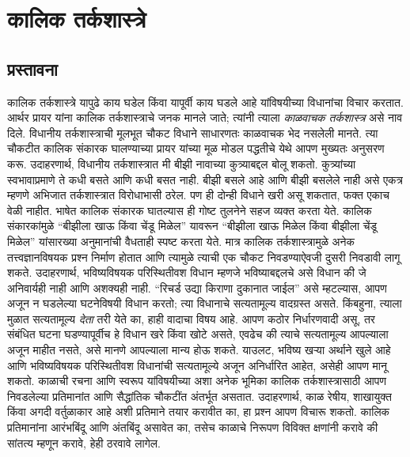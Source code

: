 \chapter{कालिक तर्कशास्त्रे}\label{aml:tl:chap}
\section{प्रस्तावना}\label{aml:tl:int:sec}
कालिक तर्कशास्त्रे यापुढे काय घडेल किंवा यापूर्वी
काय घडले आहे यांविषयीच्या विधानांचा विचार करतात.
आर्थर प्रायर यांना कालिक तर्कशास्त्राचे जनक मानले
जाते; त्यांनी त्याला \emph{काळवाचक तर्कशास्त्र}
असे नाव दिले. विधानीय तर्कशास्त्राची मूलभूत चौकट
विधाने साधारणतः काळवाचक भेद नसलेली मानते. त्या
चौकटीत कालिक संकारक घालण्याच्या प्रायर यांच्या
मूळ मोडल पद्धतीचे येथे आपण मुख्यतः अनुसरण करू.
उदाहरणार्थ, विधानीय तर्कशास्त्रात मी बीझी नावाच्या
कुत्र्याबद्दल बोलू शकतो. कुत्र्यांच्या स्वभावाप्रमाणे
ते कधी बसते आणि कधी बसत नाही. बीझी बसले आहे
आणि बीझी बसलेले नाही असे एकत्र म्हणणे अभिजात
तर्कशास्त्रात विरोधाभासी ठरेल. पण ही दोन्ही विधाने
खरी असू शकतात, फक्त एकाच वेळी नाहीत. भाषेत
कालिक संकारक घातल्यास ही गोष्ट तुलनेने सहज
व्यक्त करता येते. कालिक संकारकांमुळे ``बीझीला
खाऊ किंवा चेंडू मिळेल'' यावरून ``बीझीला खाऊ
मिळेल किंवा बीझीला चेंडू मिळेल'' यांसारख्या
अनुमानांची वैधताही स्पष्ट करता येते.
मात्र कालिक तर्कशास्त्रामुळे अनेक तत्त्वज्ञानविषयक
प्रश्न निर्माण होतात आणि त्यामुळे त्याची एक चौकट
निवडण्याऐवजी दुसरी निवडावी लागू शकते. उदाहरणार्थ,
भविष्यविषयक परिस्थितीवश विधान म्हणजे भविष्याबद्दलचे
असे विधान की जे अनिवार्यही नाही आणि अशक्यही नाही.
``रिचर्ड उद्या किराणा दुकानात जाईल'' असे म्हटल्यास,
आपण अजून न घडलेल्या घटनेविषयी विधान करतो; त्या
विधानाचे सत्यतामूल्य वादग्रस्त असते. किंबहुना,
त्याला मुळात सत्यतामूल्य \emph{देता} तरी येते का,
हाही वादाचा विषय आहे. आपण कठोर निर्धारणवादी
असू, तर संबंधित घटना घडण्यापूर्वीच हे विधान
खरे किंवा खोटे असते, एवढेच की त्याचे सत्यतामूल्य
आपल्याला अजून माहीत नसते, असे मानणे आपल्याला
मान्य होऊ शकते. याउलट, भविष्य खऱ्या अर्थाने
खुले आहे आणि भविष्यविषयक परिस्थितीवश विधानांची
सत्यतामूल्ये अजून अनिर्धारित आहेत, असेही आपण
मानू शकतो.
काळाची रचना आणि स्वरूप यांविषयीच्या अशा अनेक
भूमिका कालिक तर्कशास्त्रासाठी आपण निवडलेल्या
प्रतिमानांत आणि सैद्धांतिक चौकटींत अंतर्भूत असतात.
उदाहरणार्थ, काळ रेषीय, शाखायुक्त किंवा अगदी
वर्तुळाकार आहे अशी प्रतिमाने तयार करावीत का,
हा प्रश्न आपण विचारू शकतो. कालिक प्रतिमानांना
आरंभबिंदू आणि अंतबिंदू असावेत का, तसेच काळाचे
निरूपण विविक्त क्षणांनी करावे की सांतत्य म्हणून
करावे, हेही ठरवावे लागेल.
